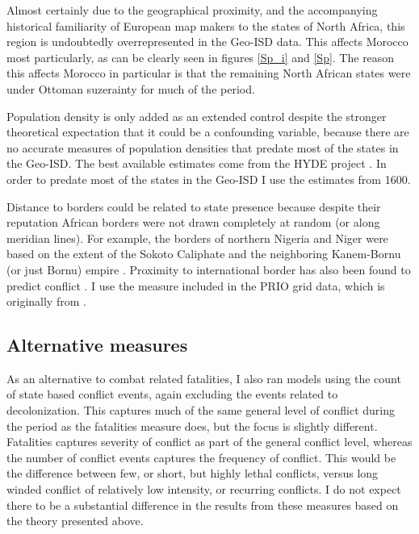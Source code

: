 \documentclass[12pt]{article}
\begin{document}
Almost certainly due to the geographical proximity, and the accompanying
historical familiarity of European map makers to the states of North Africa,
this region is undoubtedly overrepresented in the Geo-ISD data. This affects
Morocco most particularly, as can be clearly seen in figures \ref{Sp_i} and
\ref{Sp}. The reason this affects Morocco in particular is that the remaining
North African states were under Ottoman suzerainty for much of the period.

Population density is only added as an extended control despite the stronger
theoretical expectation that it could be a confounding variable, because there
are no accurate measures of population densities that predate most of the
states in the Geo-ISD. The best available estimates come from the HYDE project
\citep{Goldewijk2016}. In order to predate most of the states in the Geo-ISD I
use the estimates from 1600.


Distance to borders could be related to state presence because despite their
reputation African borders were not drawn completely at random (or along
meridian lines). For example, the borders of northern Nigeria and Niger were
based on the extent of the Sokoto Caliphate and the neighboring Kanem-Bornu (or
just Bornu) empire \citep{HiribarrenVincent2017AHoB}. Proximity to international
border has also been found to predict conflict \citep{Buhaug2002}. I use the
measure included in the PRIO grid data, which is originally from
\citet{Weidmann2010a}.

\subsection{Alternative measures}

As an alternative to combat related fatalities, I also ran models using the
count of state based conflict events, again excluding the events related to
decolonization. This captures much of the same general level of conflict during
the period as the fatalities measure does, but the focus is slightly different.
Fatalities captures severity of conflict as part of the general conflict level,
whereas the number of conflict events captures the frequency of conflict. This
would be the difference between few, or short, but highly lethal conflicts,
versus long winded conflict of relatively low intensity, or recurring conflicts.
I do not expect there to be a substantial difference in the results from these
measures based on the theory presented above.
\end{document}
